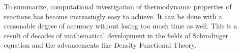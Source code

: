 To summarize, computational investigation of thermodynamic properties of reactions has become increasingly easy to achieve. It can be done with a reasonable degree of accuracy without losing too much time as well. This is a result of decades of mathematical development in the fields of Schrodinger equation and the advancements like Density Functional Theory.